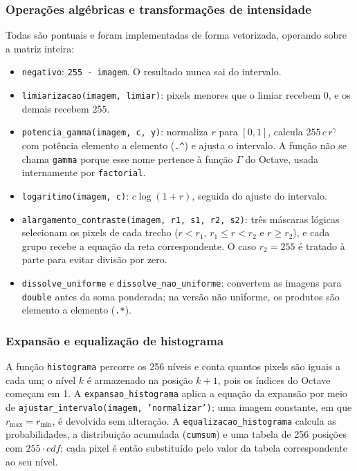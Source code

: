 \documentclass[11pt,a4paper]{article}
\begin{document}
\subsubsection{Operações algébricas e transformações de intensidade}

Todas são pontuais e foram implementadas de forma vetorizada, operando sobre a matriz inteira:
\begin{itemize}
  \item \texttt{negativo}: \texttt{255 - imagem}. O resultado nunca sai do intervalo.
  \item \texttt{limiarizacao(imagem, limiar)}: pixels menores que o limiar recebem 0, e os demais recebem 255.
  \item \texttt{potencia\_gamma(imagem, c, y)}: normaliza $r$ para $[0,1]$, calcula $255\,c\,r^{\gamma}$ com potência elemento a elemento (\texttt{.\^{}}) e ajusta o intervalo. A função não se chama \texttt{gamma} porque esse nome pertence à função $\Gamma$ do Octave, usada internamente por \texttt{factorial}.
  \item \texttt{logaritimo(imagem, c)}: $c\log(1+r)$, seguida do ajuste do intervalo.
  \item \texttt{alargamento\_contraste(imagem, r1, s1, r2, s2)}: três máscaras lógicas selecionam os pixels de cada trecho ($r<r_1$, $r_1\le r<r_2$ e $r\ge r_2$), e cada grupo recebe a equação da reta correspondente. O caso $r_2=255$ é tratado à parte para evitar divisão por zero.
  \item \texttt{dissolve\_uniforme} e \texttt{dissolve\_nao\_uniforme}: convertem as imagens para \texttt{double} antes da soma ponderada; na versão não uniforme, os produtos são elemento a elemento (\texttt{.*}).
\end{itemize}

\subsubsection{Expansão e equalização de histograma}

A função \texttt{histograma} percorre os 256 níveis e conta quantos pixels são iguais a cada um; o nível $k$ é armazenado na posição $k+1$, pois os índices do Octave começam em 1. A \texttt{expansao\_histograma} aplica a equação da expansão por meio de \texttt{ajustar\_intervalo(imagem, 'normalizar')}; uma imagem constante, em que $r_{\max}=r_{\min}$, é devolvida sem alteração. A \texttt{equalizacao\_histograma} calcula as probabilidades, a distribuição acumulada (\texttt{cumsum}) e uma tabela de 256 posições com $255\cdot cdf$; cada pixel é então substituído pelo valor da tabela correspondente ao seu nível.
\end{document}
